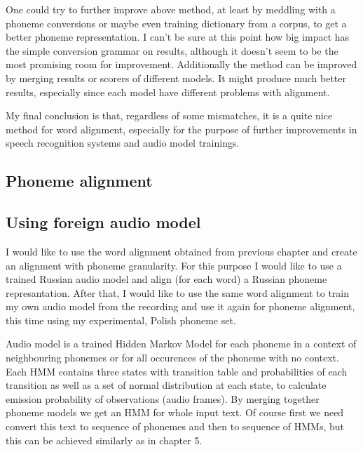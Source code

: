 \documentclass[12pt,a4paper,english]{article}
\begin{document}
One could try to further improve above method, at least by meddling with a phoneme conversions or maybe even training dictionary from a corpus, to get a better phoneme representation. I can't be sure at this point how big impact has the simple conversion grammar on results, although it doesn't seem to be the most promising room for improvement.  Additionally the method can be improved by merging results or scorers of different models. It might produce much better results, especially since each model have different problems with alignment. \newline

My final conclusion is that, regardless of some mismatches, it is a quite nice method for word alignment, especially for the purpose of further improvements in speech recognition systems and audio model trainings.

\newpage
\begin{center}
    \section{Phoneme alignment}
\end {center}
\setcounter{equation}{0}

\subsection{Using foreign audio model}

I would like to use the word alignment obtained from previous chapter and create an alignment with phoneme granularity. For this purpose I would like to use a trained Russian audio model and align (for each word) a Russian phoneme represantation. After that, I would like to use the same word alignment to train my own audio model from the recording and use it again for phoneme alignment, this time using my experimental, Polish phoneme set. \newline

Audio model is a trained Hidden Markov Model for each phoneme in a context of neighbouring phonemes or for all occurences of the phoneme with no context. Each HMM contains three states with transition table and probabilities of each transition as well as a set of normal distribution at each state, to calculate emission probability of observations (audio frames). \newline
By merging together phoneme models we get an HMM for whole input text. Of course first we need convert this text to sequence of phonemes and then to sequence of HMMs, but this can be achieved similarly as in chapter 5. \newline
\end{document}
